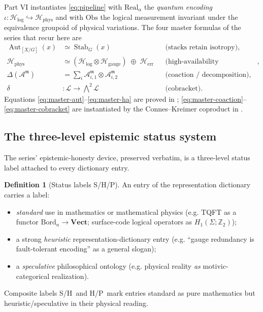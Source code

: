 \documentclass[12pt]{article}
\theoremstyle{definition}
\newtheorem{definition}[theorem]{Definition}
\theoremstyle{remark}
\newcommand{\Vect}{\mathbf{Vect}}
\newcommand{\Ho}{\mathcal{H}}
\newcommand{\Hphys}{\Ho_{\mathrm{phys}}}
\newcommand{\Hlog}{\Ho_{\mathrm{log}}}
\newcommand{\Hgauge}{\Ho_{\mathrm{gauge}}}
\newcommand{\Herr}{\Ho_{\mathrm{err}}}
\newcommand{\Real}{\mathrm{Real}}
\newcommand{\Obs}{\mathrm{Obs}}
\newcommand{\Aut}{\operatorname{Aut}}
\newcommand{\Stab}{\operatorname{Stab}}
\newcommand{\quot}[2]{[#1/#2]}
\newcommand{\ZZ}{\mathbb{Z}}
\newcommand{\cop}{\Delta}
\newcommand{\Ss}{\textsf{S}}
\newcommand{\Hh}{\textsf{H}}
\newcommand{\Pp}{\textsf{P}}
\begin{document}
Part VI instantiates \eqref{eq:pipeline} with $\Real_\alpha$ the \emph{quantum
encoding} $\iota:\Hlog\hookrightarrow\Hphys$ and with $\Obs$ the logical measurement
invariant under the equivalence groupoid of physical variations. The four master
formulas of the series that recur here are
\begin{align}
\Aut_{\quot{X}{G}}(x)&\simeq\Stab_G(x) && \text{(stacks retain isotropy)},
\label{eq:master-aut}\\
\Hphys&\simeq (\Hlog\otimes\Hgauge)\;\oplus\;\Herr &&
\text{(high-availability decomposition)},
\label{eq:master-ha}\\
\cop(\mathcal{A}^{\mathfrak m})&=\textstyle\sum_i
\mathcal{A}^{\mathfrak m}_{i,1}\otimes\mathcal{A}^{\mathfrak m}_{i,2} &&
\text{(coaction / decomposition)},
\label{eq:master-coaction}\\
\delta&:\mathcal{L}\to\textstyle\bigwedge^2\mathcal{L} && \text{(cobracket)}.
\label{eq:master-cobracket}
\end{align}
Equations \eqref{eq:master-aut}--\eqref{eq:master-ha} are proved in
; \eqref{eq:master-coaction}--\eqref{eq:master-cobracket} are
instantiated by the Connes--Kreimer coproduct in .

\subsection{The three-level epistemic status system}

The series' epistemic-honesty device, preserved verbatim, is a three-level status
label attached to every dictionary entry.

\begin{definition}[Status labels \Ss/\Hh/\Pp]
\label{def:status}
An entry of the representation dictionary carries a label:
\begin{itemize}
\item[\Ss] \emph{standard} use in mathematics or mathematical physics (e.g. TQFT as a
functor $\mathrm{Bord}_n\to\Vect$; surface-code logical operators as $H_1(\Sigma;\ZZ_2)$);
\item[\Hh] a strong \emph{heuristic} representation-dictionary entry (e.g. ``gauge
redundancy is fault-tolerant encoding'' as a general slogan);
\item[\Pp] a \emph{speculative} philosophical ontology (e.g. physical reality \emph{as}
motivic-categorical realization).
\end{itemize}
Composite labels \Ss/\Hh\ and \Hh/\Pp\ mark entries standard as pure mathematics but
heuristic/speculative in their physical reading.
\end{definition}
\end{document}
